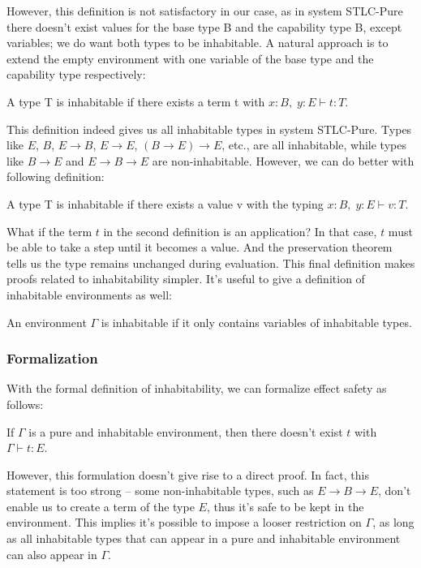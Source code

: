 However, this definition is not satisfactory in our case, as in system
STLC-Pure there doesn't exist values for the base type B and the
capability type B, except variables; we do want both types to be
inhabitable. A natural approach is to extend the empty environment
with one variable of the base type and the capability type
respectively:

\begin{definition}
  A type T is inhabitable if there exists a term t with
  $x:B,\; y:E \vdash t : T$.
\end{definition}

This definition indeed gives us all inhabitable types in system
STLC-Pure. Types like $E$, $B$, $E \to B$, $E \to E$,
$(B \to E) \to E$, etc., are all inhabitable, while types like
$B \to E$ and $E \to B \to E$ are non-inhabitable. However, we can do
better with following definition:

\begin{definition}
  A type T is inhabitable if there exists a value v with the typing
  $x:B,\; y:E \vdash v : T$.
\end{definition}

What if the term $t$ in the second definition is an application? In
that case, $t$ must be able to take a step until it becomes a
value. And the preservation theorem tells us the type remains
unchanged during evaluation. This final definition makes proofs
related to inhabitability simpler. It's useful to give a definition of
inhabitable environments as well:

\begin{definition}
  An environment $\Gamma$ is inhabitable if it only contains variables
  of inhabitable types.
\end{definition}

\subsubsection{Formalization}

With the formal definition of inhabitability, we can formalize effect
safety as follows:

\begin{definition}
  If $\Gamma$ is a pure and inhabitable environment, then there
  doesn't exist $t$ with $\Gamma \vdash t : E$.
\end{definition}

However, this formulation doesn't give rise to a direct proof. In
fact, this statement is too strong -- some non-inhabitable types, such
as $E \to B \to E$, don't enable us to create a term of the type $E$,
thus it's safe to be kept in the environment. This implies it's
possible to impose a looser restriction on $\Gamma$, as long as all
inhabitable types that can appear in a pure and inhabitable
environment can also appear in $\Gamma$.

